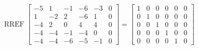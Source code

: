 \begin{exerciseAnswer} 


\[\operatorname{RREF} \left[\begin{array}{ccccc|c}
-5 & 1 & -1 & -6 & -3 & 0 \\
1 & -2 & 2 & -6 & 1 & 0 \\
-4 & 2 & 0 & 4 & 4 & 0 \\
-4 & -4 & -1 & -4 & 0 & 0 \\
-4 & -4 & -6 & -5 & -1 & 0
\end{array}\right] = \left[\begin{array}{ccccc|c}
1 & 0 & 0 & 0 & 0 & 0 \\
0 & 1 & 0 & 0 & 0 & 0 \\
0 & 0 & 1 & 0 & 0 & 0 \\
0 & 0 & 0 & 1 & 0 & 0 \\
0 & 0 & 0 & 0 & 1 & 0
\end{array}\right] \]



\end{exerciseAnswer}
